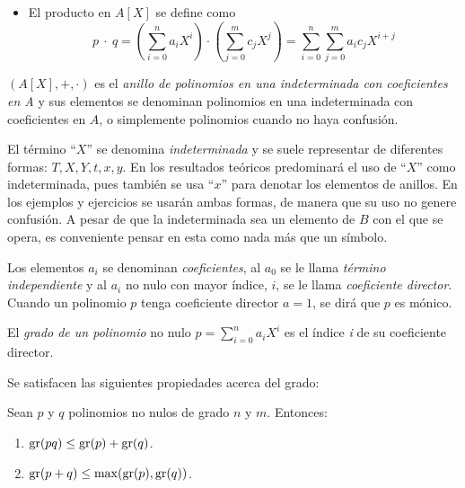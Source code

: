 \begin{deff}{\cite[p.~51]{Rosenberger}}
\begin{itemize}
        \item El producto en $A[X]$ se define como
        \[p \ \cdot \ q = \left(\sum\limits_{i=0}^n a_i X^i\right) \cdot \left(\sum\limits_{j=0}^m c_j X^j\right) = \sum\limits_{i=0}^{n} \sum\limits_{j = 0}^m a_i c_jX^{i+j}
        \]
    \end{itemize}
    
    \item $(A[X], +,\cdot)$ es el \textit{anillo de polinomios en una indeterminada con coeficientes en A} y sus elementos se denominan polinomios en una indeterminada con coeficientes en $A$, o simplemente polinomios cuando no haya confusión.
\end{deff}

\begin{nott}
    \item El término ``$X$'' se denomina \textit{indeterminada} y se suele representar de diferentes formas: $T,X,Y, t, x, y$.
        En los resultados teóricos predominará el uso de ``$X$'' como indeterminada, pues también se usa ``$x$'' para denotar los elementos de anillos. En los ejemplos y ejercicios se usarán ambas formas, de manera que su uso no genere confusión.
    A pesar de que la indeterminada sea un elemento de $B$ con el que se opera, es conveniente pensar en esta como nada más que un símbolo.
    
    \item Los elementos $a_i$ se denominan \textit{coeficientes}, al $a_0$ se le llama \textit{término independiente} y al $a_i$ no nulo con mayor índice, $i$, se le llama \textit{coeficiente director}. Cuando un polinomio $p$ tenga coeficiente director $a = 1$, se dirá que $p$ es mónico.
\end{nott}



\begin{deff}{\cite[p~51]{Rosenberger}}
    El \textit{grado de un polinomio} no nulo $p = \sum\limits_{i=0}^{n} a_i X^i$ es el índice \textit{i} de su coeficiente director.
\end{deff}

    Se satisfacen las siguientes propiedades acerca del grado:
\begin{lema}{}\label{lema:grado_polinomios}
    Sean $p$ y $q$ polinomios no nulos de grado $n$ y $m$. Entonces:
    \begin{enumerate}[label=\roman*)]
        \item $\text{gr}(pq) \leq \text{gr}(p) + \text{gr}(q)$.
        \item $\text{gr}(p+q) \leq \max(\text{gr}(p),\text{gr}(q))$.
    \end{enumerate}
\end{lema}

